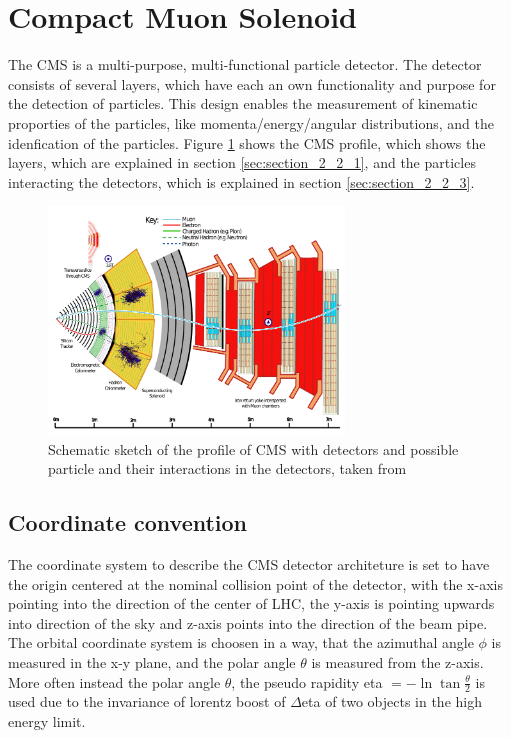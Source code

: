 \section{Compact Muon Solenoid}
\label{sec:section_2_2}

The \gls{CMS} is a multi-purpose, multi-functional particle detector. The detector consists of several layers, which have each an own functionality and purpose for the detection of particles. This design enables the measurement of kinematic proporties of the particles, like momenta/energy/angular distributions, and the idenfication of the particles. Figure \ref{fig:fig_2_5} shows the \gls{CMS} profile, which shows the layers, which are explained in section \ref{sec:section_2_2_1}, and the particles interacting the detectors, which is explained in section \ref{sec:section_2_2_3}.

\begin{figure}[ht]
	\centering
	\includegraphics[width=0.7\textwidth]{pictures/CMS.pdf}

	\caption[Profile of CMS detector]{Schematic sketch of the profile of \gls{CMS} with detectors and possible particle and their interactions in the detectors, taken from \cite{PARTICLEFLOW}}
	\label{fig:fig_2_5}
\end{figure}


\subsection{Coordinate convention}

The coordinate system to describe the \gls{CMS} detector architeture is set to have the origin centered at the nominal collision point of the detector, with the x-axis pointing into the direction of the center of LHC, the y-axis is pointing upwards into direction of the sky and z-axis points into the direction of the beam pipe. The orbital coordinate system is choosen in a way, that the azimuthal angle $\phi$ is measured in the x-y plane, and the polar angle $\theta$ is measured from the z-axis. More often instead the polar angle $\theta$, the pseudo rapidity \gls{eta} $= -\ln{\tan{\frac{\theta}{2}}}$ is used due to the invariance of lorentz boost of $\Delta$\gls{eta} of two objects in the high energy limit.



